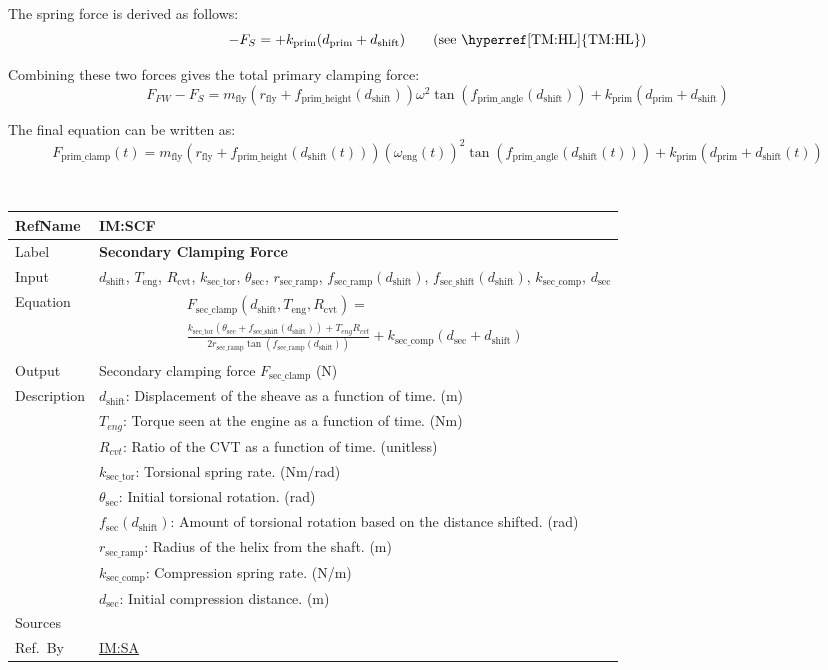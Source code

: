 \documentclass[12pt]{article}
\newcommand{\colAwidth}{0.13\textwidth}
\newcommand{\colBwidth}{0.82\textwidth}
\newcommand{\hpref}[1]{\hyperref[#1]{#1}}
\newcommand{\definstance}[8] {
~\newline
\noindent
\begin{minipage}{\textwidth}
\renewcommand*{\arraystretch}{1.5}
\begin{tabular}{| p{\colAwidth} | p{\colBwidth}|}
  \hline
  \rowcolor[gray]{0.9}
  RefName& \textbf{#1} \label{#1}\\
  \hline
  Label& \bf #2 \\
  \hline
  Input& #3\\
  \hline
  Equation& #4\\
  \hline
  Output& #5\\
  \hline
  Description& #6 \\
  \hline
  Sources& #7 \\
  \hline
  Ref.\ By & #8\\
  \hline
\end{tabular}
\end{minipage}\\
}
\begin{document}
The spring force is derived as follows: 
\[
-F_S = + k_{\text{prim}} (d_{\text{prim}} + d_{\text{shift}}) \tag*{\text{(see \hyperref[TM:HL]{TM:HL})}}
\]

Combining these two forces gives the total primary clamping force:
\[
F_{FW} - F_S =  m_\text{fly} (r_{\text{fly}} + f_{\text{prim\_height}}(d_{\text{shift}}))\omega^2 \tan(f_{\text{prim\_angle}}(d_{\text{shift}})) + k_{\text{prim}} (d_{\text{prim}} + d_{\text{shift}})
\]

The final equation can be written as:
\[
F_{\text{prim\_clamp}}(t) = m_\text{fly} (r_{\text{fly}} + f_{\text{prim\_height}}({d_\text{shift}(t)}))(\omega_\text{eng}(t))^2 \tan(f_{\text{prim\_angle}}(d_\text{shift}(t))) + k_{\text{prim}} (d_{\text{prim}} + d_\text{shift}(t))
\]

\definstance
{IM:SCF}
{Secondary Clamping Force}
{$d_\text{shift}$, $T_\text{eng}$, $R_\text{cvt}$, $k_{\text{sec\_tor}}$, $\theta_{\text{sec}}$, $r_{\text{sec\_ramp}}$, $f_{\text{sec\_ramp}}(d_{\text{shift}})$, $f_{\text{sec\_shift}}(d_{\text{shift}})$, $k_{\text{sec\_comp}}$, $d_{\text{sec}}$} %
{
  \begin{multline*}
    F_{\text{sec\_clamp}}(d_\text{shift}, T_\text{eng}, R_\text{cvt}) = \\
  \frac{k_{\text{sec\_tor}} (\theta_{\text{sec}} + f_{\text{sec\_shift}}(d_\text{shift})) + T_{eng} R_{cvt}}{2 r_{\text{sec\_ramp}} \tan(f_{\text{sec\_ramp}}(d_{\text{shift}}))} + k_{\text{sec\_comp}} (d_{\text{sec}} + d_{\text{shift}})
  \end{multline*}
} %
{Secondary clamping force $F_{\text{sec\_clamp}}$ (N)} %
{
  $d_{\text{shift}}$: Displacement of the sheave as a function of time. (m)\\
  &$T_{eng}$: Torque seen at the engine as a function of time. (Nm) \\
  &$R_{cvt}$: Ratio of the CVT as a function of time. (unitless) \\
  &$k_{\text{sec\_tor}}$: Torsional spring rate. (Nm/rad)\\
  &$\theta_{\text{sec}}$: Initial torsional rotation. (rad)\\
  &$f_{\text{sec}}(d_{\text{shift}})$: Amount of torsional rotation based on the distance shifted. (rad) \\
  &$r_{\text{sec\_ramp}}$: Radius of the helix from the shaft. (m)\\
  &$k_{\text{sec\_comp}}$: Compression spring rate. (N/m)\\
  &$d_{\text{sec}}$: Initial compression distance. (m)
} %
{} %
{\hpref{IM:SA}}
\end{document}
